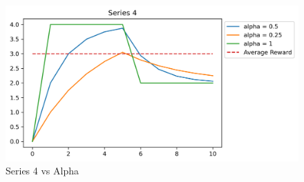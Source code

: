 \documentclass[12pt]{article}
\begin{document}
\begin{figure}
  \centering
  \includegraphics[width=\linewidth]{series_4.png}
  \caption{Series 4 vs Alpha}
  \label{fig:series-4}
\end{figure}



\end{document}
